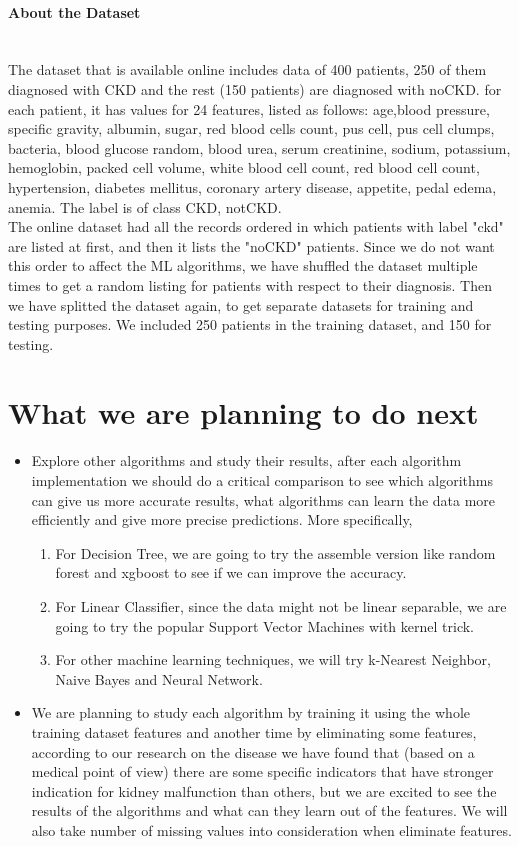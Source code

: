 \documentclass[11pt]{article}
\begin{document}
\paragraph{About the Dataset} \mbox{}\\

The dataset that is available online includes data of 400 patients, 250 of them diagnosed with CKD and the rest (150 patients) are diagnosed with noCKD. for each patient, it has values for 24 features, listed as follows: age,blood pressure, specific gravity, albumin, sugar, red blood cells count, pus cell, pus cell clumps, bacteria, blood glucose random, blood urea, serum creatinine, sodium, potassium, hemoglobin, packed cell volume, white blood cell count, red blood cell count, hypertension, diabetes mellitus, coronary artery disease, appetite, pedal edema, anemia. The label is of class {CKD, notCKD}. \mbox{}\\
The online dataset had all the records ordered in which patients with label "ckd" are listed at first, and then it lists the "noCKD" patients. Since we do not want this order to affect the ML algorithms, we have shuffled the dataset multiple times to get a random listing for patients with respect to their diagnosis. Then we have splitted the dataset again, to get separate datasets for training and testing purposes. We included 250 patients in the training dataset, and 150 for testing. 

\section{What we are planning to do next}
\begin{itemize}
\item Explore other algorithms and study their results, after each algorithm implementation we should do a critical comparison to see which algorithms can give us more accurate results, what algorithms can learn the data more efficiently and give more precise predictions. More specifically, 
\begin{enumerate}
    \item For Decision Tree, we are going to try the assemble version like random forest and xgboost to see if we can improve the accuracy.
    \item For Linear Classifier, since the data might not be linear separable, we are going to try the popular Support Vector Machines with kernel trick.
    \item For other machine learning techniques, we will try k-Nearest Neighbor, Naive Bayes and Neural Network.
\end{enumerate}
\item We are planning to study each algorithm by training it using the whole training dataset features and another time by eliminating some features, according to our research on the disease we have found that (based on a medical point of view) there are some specific indicators that have stronger indication for kidney malfunction than others, but we are excited to see the results of the algorithms and what can they learn out of the features. We will also take number of missing values into consideration when eliminate features.
\end{itemize}
\end{document}
